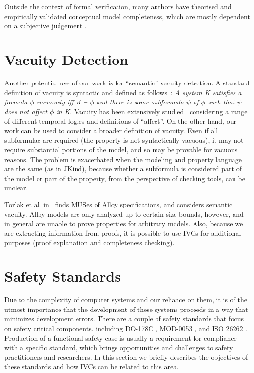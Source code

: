 Outside the context of formal verification, many authors have theorised and empirically validated conceptual model completeness, which are mostly dependent on a subjective judgement \cite{drechsler2012completeness, firesmith2005your, chang2007finding,katta2013investigating, zowghi2003three, espana2009evaluating}.



\section{Vacuity Detection}
Another potential use of our work is for ``semantic'' vacuity detection.  A standard definition of vacuity is syntactic and defined as follows~\cite{Kupferman:2006:SCF}: {\em A system K satisfies a formula $\phi$ vacuously iff $K \vdash \phi$ and there is some subformula $\psi$ of $\phi$ such that $\psi$ does not affect $\phi$ in K}.  Vacuity has been extensively studied~\cite{Gurfinkel:2012:RVB,Chockler2008,DBLP:Ben-DavidK13,Kupferman:2006:SCF,Chockler:2007,Beer1997} considering a range of different temporal logics and definitions of ``affect''.  On the other hand, our work can be used to consider a broader definition of vacuity.  Even if all subformulae are required (the property is not syntactically vacuous), it may not require substantial portions of the model, and so may be provable for vacuous reasons.  The problem is exacerbated when the modeling and property language are the same (as in JKind), because whether a subformula is considered part of the model or part of the property, from the perspective of checking tools, can be unclear.

Torlak et al. in~\cite{Torlak08:cores} finds MUSes of Alloy
specifications, and considers semantic vacuity.
 Alloy models are only analyzed up to certain
size bounds, however, and in general are unable to prove properties
for arbitrary models. Also, because we are extracting information from
proofs, it is possible to use IVCs for additional purposes (proof
explanation and completeness checking).

\section{Safety Standards}
Due to the complexity of computer systems and our reliance on them, it is of the utmost importance that the development of these systems proceeds in a way that minimizes development errors. There are a couple of safety standards that focus on safety critical components, including DO-178C \cite{DO178C}, MOD-0053 \cite{standard2007standard}, and ISO 26262 \cite{iso201126262}. Production of a functional safety case is usually a requirement for compliance with a specific standard, which brings opportunities and challenges to safety practitioners and researchers. In this section we briefly describes the objectives of these standards and how IVCs can be related to this area.

